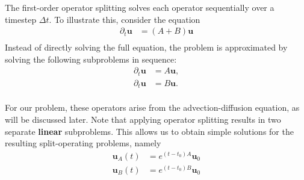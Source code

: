 The first-order operator splitting solves each operator sequentially over a timestep $\Delta t$. To illustrate this, consider the equation 
\begin{align}
    \partial_t  \bm{u} &= (A+B)\bm{u} \\
\end{align}
Instead of directly solving the full equation, the problem is approximated
by solving the following subproblems in sequence:
\begin{align}
    \partial_t \bm{u} &= A\bm{u}, \\
    \partial_t \bm{u} &= B\bm{u}. \\
\end{align}

For our problem, these operators arise from the advection-diffusion 
equation, as will be discussed later. Note that applying operator 
splitting results in two separate \textbf{linear} subproblems. This allows
us to obtain simple solutions for the resulting split-operating problems,
namely
\begin{align}
    \bm u_A(t) &= e^{(t-t_0) A}\bm u_0 \\
    \bm u_B(t) &= e^{(t-t_0) B}\bm u_0 
\end{align}

